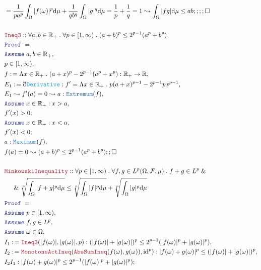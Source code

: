 \documentclass[12pt]{article}
\newcommand{\TYPE}[1]{\textcolor{NavyBlue}{\mathtt{#1}}}
\newcommand{\FUNC}[1]{\textcolor{Cerulean}{\mathtt{#1}}}
\newcommand{\LOGIC}[1]{\textcolor{Blue}{\mathtt{#1}}}
\newcommand{\THM}[1]{\textcolor{Maroon}{\mathtt{#1}}}
\renewcommand{\.}{\; . \;}
\newcommand{\de}{: \kern 0.1pc =}
\newcommand{\NewLine}{\\ & \kern 1pc}
\newcommand{\Reals}{\mathbb{R} }
\renewcommand{\And}{\; \& \;}
\newcommand{\A}{\LOGIC{Assume} \;}
\newcommand{\ByDef}{\eth}
\newcommand{\Proof}{\LOGIC{Proof} \; }
\newcommand{\F}{\mathcal{F}}
\renewcommand{\O}{\Omega}
\begin{document}
\newpage
\begin{align*}
& = \frac{1}{pa^p}\int_\O |f(\omega)|^p \mathrm{d}\mu + \frac{1}{qb^q} \int_\O |g|^q\mathrm{d}\mu = \frac{1}{p} + \frac{1}{q} = 1 \leadsto    \int_\O |fg|\mathrm{d}\mu \le ab
 ;;;; \square
 \\ \\
 & \THM{Ineq3} :: \forall a,b \in \Reals_+ \. \forall p \in [1,\infty) \. (a + b)^p \le 2^{p-1}(a^p + b^p) \\ 
 &   \Proof=         \\
 &  \A a,b \in \Reals_+,     \\
 &   p \in [1,\infty),                       \\
 &    f  \de \Lambda   x \in \Reals_+ \. (a  +  x)^p  - 2^{p-1}(a^p + x^p) : \Reals_+ \to \Reals,                  \\
 & E_1 \de \ByDef\FUNC{Derivative}: f' = \Lambda   x \in \Reals_+ \. p(a + x)^{p-1}  -2^{p-1}px^{p-1},          \\
 & E_1 \leadsto f'(a) =  0 \leadsto  a : \TYPE{Extremum}(f),        \\
 & \A x \in \Reals_{+} : x > a, \\
 & f'(x) > 0 ; \\
 & \A x \in \Reals_{+} : x < a,\\
 &  f'(x) < 0 ;     \\
 & a : \TYPE{Maximum}(f),  \\
 & f(a) = 0 \leadsto   (a + b)^p \le 2^{p-1}(a^p + b^p) ;; \square
 \\ \\
 & \THM{MinkowskiInequality} :: \forall p \in [1,\infty) \.  \forall f,g \in L^p(\O,\F,\mu) \. f + g \in L^p \And 
\NewLine \And 
  \sqrt[p]{\int_\O |f + g|^p \mathrm{d} \mu} \le \sqrt[p]{\int_\O |f|^p \mathrm{d}\mu} +  \sqrt[p]{\int_\O |g|^p \mathrm{d}\mu}    \\
&  \Proof = \\
&  \A p \in [1, \infty), \\
&   \A f,g \in L^p,  \\
&   \A \omega \in \O,    \\
&  I_1 \de  \THM{Ineq3}(|f(\omega)|,|g(\omega)|,p) : (|f(\omega)| + |g(\omega)|)^p \le 2^{p-1}(|f(\omega) |^p + |g(\omega)|^p), \\
& I_2 \de \THM{MonotoneActIneq}(\THM{AbsSumIneq}(f(\omega),g(\omega)),\mathrm{id}^p) : |f(\omega) +  g(\omega)|^p \le (|f(\omega)| + |g(\omega)| )^p,          \\    
& I_2I_1 : |f(\omega) +  g(\omega)|^p \le 2^{p-1}(|f(\omega) |^p + |g(\omega)|^p); \\

\end{align*}
\end{document}
